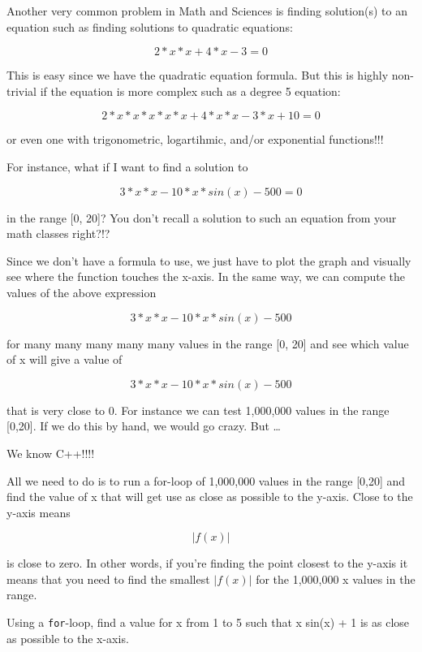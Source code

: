 \newpage{}

Another very common problem in Math and Sciences is finding solution(s)
to an equation such as finding solutions to quadratic equations:

\[2 * x * x + 4 * x - 3 = 0\]

This is easy since we have the quadratic equation formula. But this is
highly non-trivial if the equation is more complex such as a degree 5
equation:

\[2 * x * x * x * x * x + 4 * x * x - 3 * x + 10 = 0\]

or even one with trigonometric, logartihmic, and/or exponential
functions!!!

For instance, what if I want to find a solution to

\[3 * x * x - 10 * x * sin(x) - 500 = 0\]

in the range [0, 20]? You don't recall a solution to
such an equation from your math classes right?!?

Since we don't have a formula to use, we just have to
plot the graph and visually see where the function touches the x-axis.
In the same way, we can compute the values of the above expression

\[3 * x * x - 10 * x * sin(x) - 500\]

for many many many many many values in the range [0, 20] and see
which value of x will give a value of

\[3 * x * x - 10 * x * sin(x) - 500\]

that is very close to 0. For instance we can test 1,000,000 values in
the range [0,20]. If we do this by hand, we would go crazy. But
\ldots

We know C++!!!!

All we need to do is to run a for-loop of 1,000,000 values in the range
[0,20] and find the value of x that will get use as close as
possible to the y-axis. Close to the y-axis means

\[|f(x)|\]

is close to zero. In other words, if you're finding the
point closest to the y-axis it means that you need to find the smallest
$|f(x)|$ for the 1,000,000 x values in the range.

\begin{ex}
Using a \texttt{for}-loop, find a value for x from 1 to 5 such
that x sin(x) + 1 is as close as possible to the x-axis.
\end{ex}
\newpage{}

